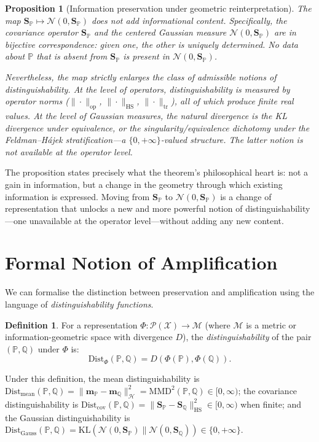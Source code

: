 \documentclass[12pt, oneside]{book}
\theoremstyle{plain}
\newtheorem{proposition}[theorem]{Proposition}
\theoremstyle{definition}
\newtheorem{definition}[theorem]{Definition}
\newcommand{\calH}{\mathcal{H}}
\newcommand{\calX}{\mathcal{X}}
\newcommand{\calP}{\mathcal{P}}
\newcommand{\calN}{\mathcal{N}}
\newcommand{\PP}{\mathbb{P}}
\newcommand{\QQ}{\mathbb{Q}}
\newcommand{\HS}{\mathrm{HS}}
\newcommand{\tr}{\mathrm{tr}}
\newcommand{\op}{\mathrm{op}}
\newcommand{\mP}{\mathbf{m}_{\PP}}
\newcommand{\mQ}{\mathbf{m}_{\QQ}}
\newcommand{\SP}{\mathbf{S}_{\PP}}
\newcommand{\SQ}{\mathbf{S}_{\QQ}}
\newcommand{\KL}{\mathrm{KL}}
\newcommand{\MMD}{\mathrm{MMD}}
\newcommand{\calM}{\mathcal{M}}
\begin{document}
\begin{proposition}[Information preservation under geometric reinterpretation]
\label{prop:info_preserve}
The map $\SP \mapsto \calN(0, \SP)$ does not add informational content. Specifically, the covariance operator $\SP$ and the centered Gaussian measure $\calN(0, \SP)$ are in bijective correspondence: given one, the other is uniquely determined. No data about $\PP$ that is absent from $\SP$ is present in $\calN(0, \SP)$.

Nevertheless, the map strictly enlarges the class of admissible notions of distinguishability. At the level of operators, distinguishability is measured by operator norms ($\|\cdot\|_{\op}$, $\|\cdot\|_{\HS}$, $\|\cdot\|_{\tr}$), all of which produce finite real values. At the level of Gaussian measures, the natural divergence is the KL divergence under equivalence, or the singularity/equivalence dichotomy under the Feldman--H\'ajek stratification---a $\{0, +\infty\}$-valued structure. The latter notion is not available at the operator level.
\end{proposition}

The proposition states precisely what the theorem's philosophical heart is: not a gain in information, but a change in the geometry through which existing information is expressed. Moving from $\SP$ to $\calN(0, \SP)$ is a change of representation that unlocks a new and more powerful notion of distinguishability---one unavailable at the operator level---without adding any new content.

\section{Formal Notion of Amplification}

We can formalise the distinction between preservation and amplification using the language of \emph{distinguishability functions}.

\begin{definition}
For a representation $\Phi: \calP(\calX) \to \calM$ (where $\calM$ is a metric or information-geometric space with divergence $D$), the \emph{distinguishability} of the pair $(\PP, \QQ)$ under $\Phi$ is:
\begin{equation}
\mathrm{Dist}_\Phi(\PP, \QQ) = D(\Phi(\PP), \Phi(\QQ)).
\end{equation}
\end{definition}

Under this definition, the mean distinguishability is $\mathrm{Dist}_{\text{mean}}(\PP, \QQ) = \|\mP - \mQ\|_{\calH}^2 = \MMD^2(\PP, \QQ) \in [0, \infty)$; the covariance distinguishability is $\mathrm{Dist}_{\text{cov}}(\PP, \QQ) = \|\SP - \SQ\|_{\HS}^2 \in [0, \infty)$ when finite; and the Gaussian distinguishability is $\mathrm{Dist}_{\text{Gauss}}(\PP, \QQ) = \KL(\calN(0, \SP) \| \calN(0, \SQ)) \in \{0, +\infty\}$.
\end{document}
